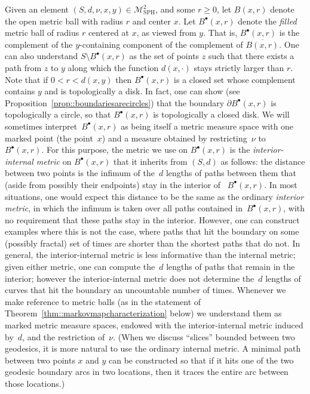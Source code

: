 \documentclass[10pt]{amsart}
\let\mathcal\mathscr
\newcommand{\sbullet}{{\scriptscriptstyle\bullet}}
\theoremstyle{plain}
\numberwithin{theorem}{section}
\theoremstyle{definition}
\newcommand\gmsspace{{\mathcal M}_{\mathrm{SPH}}}
\let\ol\overline
\newcommand{\fb}[2]{B^\sbullet(#1,#2)}
\begin{document}
Given an element $(S, d, \nu, x, y) \in \gmsspace^2$, and some $r \geq 0$, let $B(x,r)$ denote the open metric ball with radius $r$ and center $x$. Let $\fb{x}{r}$ denote the \emph{filled} metric ball of radius $r$ centered at $x$, as viewed from $y$. That is, $\fb{x}{r}$ is the complement of the $y$-containing component of the complement of $\ol{B(x,r)}$. One can also understand $S \setminus \fb{x}{r}$ as the set of points $z$ such that there exists a path from $z$ to $y$ along which the function $d(x, \cdot)$ stays strictly larger than $r$. Note that if $0 < r < d(x,y)$ then $\fb{x}{r}$ is a closed set whose complement contains $y$ and is topologically a disk. In fact, one can show (see Proposition~\ref{prop::boundariesarecircles}) that the boundary $\partial \fb{x}{r}$ is topologically a circle, so that $\fb{x}{r}$ is topologically a closed disk. We will sometimes interpret~$\fb{x}{r}$ as being itself a metric measure space with one marked point (the point~$x$) and a measure obtained by restricting~$\nu$ to~$\fb{x}{r}$. For this purpose, the metric we use on $\fb{x}{r}$ is the \emph{interior-internal metric} on $\fb{x}{r}$ that it inherits from $(S,d)$ as follows: the distance between two points is the infimum of the~$d$ lengths of paths between them that (aside from possibly their endpoints) stay in the interior of~ $\fb{x}{r}$. In most situations, one would expect this distance to be the same as the ordinary \emph{interior metric}, in which the infimum is taken over all paths contained in~$\fb{x}{r}$, with no requirement that these paths stay in the interior. However, one can construct examples where this is not the case, \ie where paths that hit the boundary on some (possibly fractal) set of times are shorter than the shortest paths that do not. In general, the interior-internal metric is less informative than the internal metric; given either metric, one can compute the~$d$ lengths of paths that remain in the interior; however the interior-internal metric does not determine the~$d$ lengths of curves that hit the boundary an uncountable number of times. Whenever we make reference to metric balls (as in the statement of Theorem~\ref{thm::markovmapcharacterization} below) we understand them as marked metric measure spaces, endowed with the interior-internal metric induced by~$d$, and the restriction of~$\nu$. (When we discuss ``slices'' bounded between two geodesics, it is more natural to use the ordinary internal metric. A minimal path between two points $x$ and $y$ can be constructed so that if it hits one of the two geodesic boundary arcs in two locations, then it traces the entire arc between those locations.)
\end{document}

